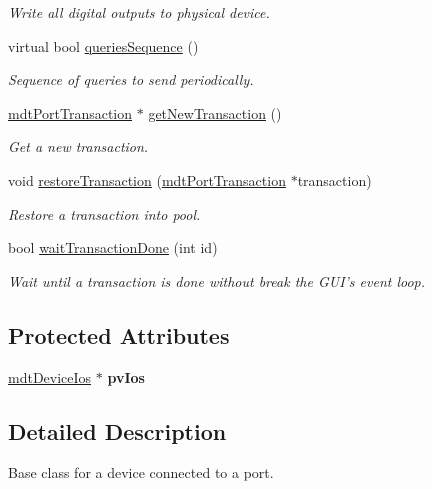\begin{DoxyCompactItemize}
\begin{DoxyCompactList}\small\item\em Write all digital outputs to physical device. \end{DoxyCompactList}\item 
virtual bool \hyperlink{classmdt_device_acba50968d201ad95c4eaa2ab2ed48b4f}{queriesSequence} ()
\begin{DoxyCompactList}\small\item\em Sequence of queries to send periodically. \end{DoxyCompactList}\item 
\hyperlink{classmdt_port_transaction}{mdtPortTransaction} $\ast$ \hyperlink{classmdt_device_a0e57cc8b749581cff447d514b9a1ff8e}{getNewTransaction} ()
\begin{DoxyCompactList}\small\item\em Get a new transaction. \end{DoxyCompactList}\item 
void \hyperlink{classmdt_device_a4619d8be240cafe48865a89f7424de92}{restoreTransaction} (\hyperlink{classmdt_port_transaction}{mdtPortTransaction} $\ast$transaction)
\begin{DoxyCompactList}\small\item\em Restore a transaction into pool. \end{DoxyCompactList}\item 
bool \hyperlink{classmdt_device_ab937015c1a319b7234442a4cc29a02a8}{waitTransactionDone} (int id)
\begin{DoxyCompactList}\small\item\em Wait until a transaction is done without break the GUI's event loop. \end{DoxyCompactList}\end{DoxyCompactItemize}
\subsection*{Protected Attributes}
\begin{DoxyCompactItemize}
\item 
\hypertarget{classmdt_device_aa84e01b13f98fc35476a2654f1c8d2b3}{
\hyperlink{classmdt_device_ios}{mdtDeviceIos} $\ast$ {\bfseries pvIos}}
\label{classmdt_device_aa84e01b13f98fc35476a2654f1c8d2b3}

\end{DoxyCompactItemize}


\subsection{Detailed Description}
Base class for a device connected to a port. 


